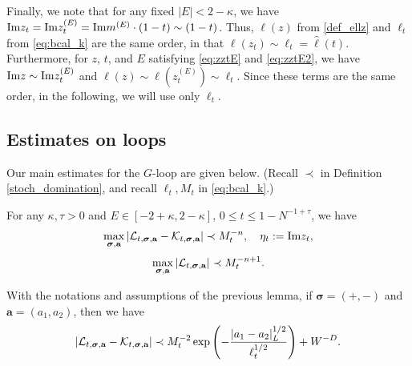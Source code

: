 Finally, we note that for any fixed \(|E| < 2 - \kappa\), we have $\mathrm{Im} z_t = \mathrm{Im} z_t^{(E)} = \mathrm{Im} m^{(E)} \cdot (1 - t) \sim (1 - t)$. Thus, \(\ell(z)\) from \eqref{def_ellz} and \(\ell_t\) from \eqref{eq:bcal_k} are the same order, in that $\ell(z_t) \sim \ell_t = \hat{\ell}(t)$. Furthermore, for \(z\), \(t\), and \(E\) satisfying \eqref{eq:zztE} and \eqref{eq:zztE2}, we have $\mathrm{Im} z\sim \mathrm{Im} z^{(E)}_t$ and $\ell(z) \sim \ell(z^{(E)}_t) \sim \ell_t$. Since these terms are the same order, in the following, we will use only \(\ell_t\).
 





\subsection{Estimates on loops}
 

Our main estimates for the  $G$-loop  are given below. (Recall $\prec$ in Definition \ref{stoch_domination}, and recall $\ell_{t},M_{t}$ in \eqref{eq:bcal_k}.) 

\begin{lemma}\label{ML:GLoop}
For any $\kappa, \tau>0$ and  
$E \in[-2+\kappa, 2-\kappa], \, 0\le t\le 1-N^{-1+\tau}$,  
we have 
\begin{equation}\label{Eq:L-KGt}
 \max_{\boldsymbol{\sigma}, \textbf{a}}\left|{\cal L}_{t, \boldsymbol{\sigma}, \textbf{a}}-{\cal K}_{t, \boldsymbol{\sigma}, \textbf{a}}\right|\prec M_{t}^{-n},\quad \eta_t:=\im z_t,  %
\end{equation}
 \begin{equation}\label{Eq:L-KGt2}
\max_{\boldsymbol{\sigma}, \textbf{a}}\left|{\cal L}_{t, \boldsymbol{\sigma}, \textbf{a}} \right|\prec M_{t}^{-n+1}. %
\end{equation}
\end{lemma}
\begin{lemma}\label{ML:GLoop_expec}
With the notations and assumptions of the previous lemma, if $\boldsymbol{\sigma}=(+,-)$ and $ \textbf{a}=(a_1, a_2)$, then
we have
\begin{equation}\label{Eq:Gdecay}
 \left| {\cal L}_{t, \boldsymbol{\sigma}, \textbf{a}}-{\cal K}_{t, \boldsymbol{\sigma}, \textbf{a}}\right|\prec M_{t}^{-2}\exp \left(-\frac{|a_1-a_2|_{L}^{1/2} }{\ell_t^{1/2}}\right)+W^{-D}. 
\end{equation}
\end{lemma}


